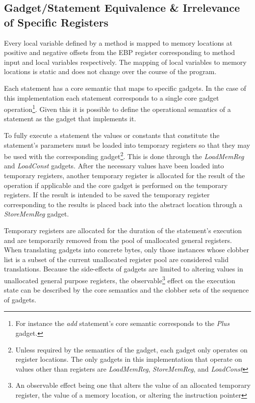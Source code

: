     \subsection{Gadget/Statement Equivalence \& Irrelevance of Specific Registers}

        Every local variable defined by a method is mapped to memory
        locations at positive and negative offsets from the EBP register
        corresponding to method input and local variables respectively. The
        mapping of local variables to memory locations is static and does
        not change over the course of the program.

        Each statement has a core semantic that maps to specific gadgets. In
        the case of this implementation each statement corresponds to a
        single core gadget operation\footnote{For instance the \emph{add}
        statement's core semantic corresponds to the \emph{Plus} gadget.}.
        Given this it is possible to define the operational semantics of a
        statement as the gadget that implements it.

        To fully execute a statement the values or constants that constitute
        the statement's parameters must be loaded into temporary registers so
        that they may be used with the corresponding gadget\footnote{Unless
        required by the semantics of the gadget, each gadget only operates
        on register locations. The only gadgets in this implementation that
        operate on values other than registers are \emph{LoadMemReg},
        \emph{StoreMemReg}, and \emph{LoadConst}}.  This is done through the
        \emph{LoadMemReg} and \emph{LoadConst} gadgets.  After the necessary
        values have been loaded into temporary registers, another temporary
        register is allocated for the result of the operation if applicable
        and the core gadget is performed on the temporary registers.  If the
        result is intended to be saved the temporary register corresponding
        to the results is placed back into the abstract location through a
        \emph{StoreMemReg} gadget.
        
        Temporary registers are allocated for the duration of the statement's
        execution and are temporarily removed from the pool of unallocated
        general registers. When translating gadgets into concrete bytes, only
        those instances whose clobber list is a subset of the current
        unallocated register pool are considered valid translations. Because the
        side-effects of gadgets are limited to altering values in unallocated
        general purpose registers, the observable\footnote{An observable effect
        being one that alters the value of an allocated temporary register, the
        value of a memory location, or altering the instruction pointer} effect
        on the execution state can be described by the core semantics and the
        clobber sets of the sequence of gadgets.
    
